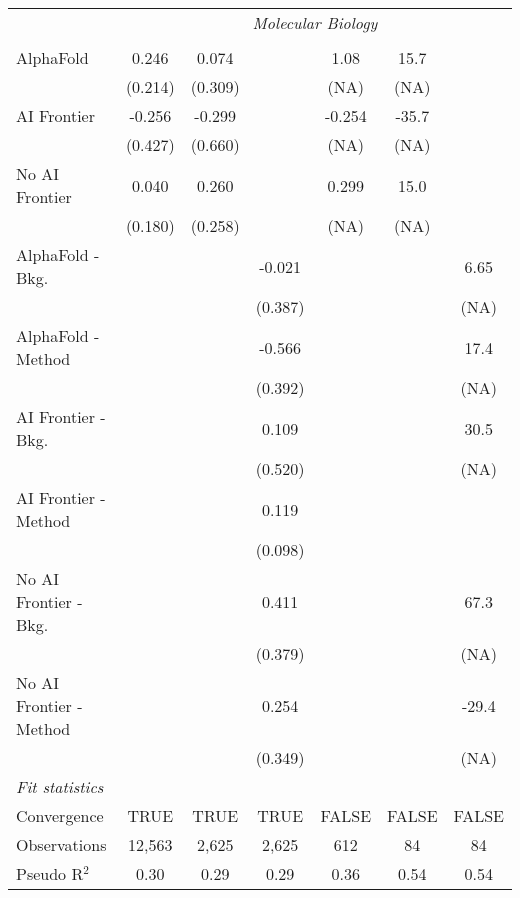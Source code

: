 \begin{tabular}{lcccccc}
 & \multicolumn{6}{c}{\textit{Molecular Biology}} \\ \\
   AlphaFold               & 0.246   & 0.074   &         & 1.08   & 15.7  &   \\   
                           & (0.214) & (0.309) &         & (NA)   & (NA)  &   \\   
   AI Frontier             & -0.256  & -0.299  &         & -0.254 & -35.7 &   \\   
                           & (0.427) & (0.660) &         & (NA)   & (NA)  &   \\   
   No AI Frontier          & 0.040   & 0.260   &         & 0.299  & 15.0  &   \\   
                           & (0.180) & (0.258) &         & (NA)   & (NA)  &   \\   
   AlphaFold - Bkg.        &         &         & -0.021  &        &       & 6.65\\   
                           &         &         & (0.387) &        &       & (NA)\\   
   AlphaFold - Method      &         &         & -0.566  &        &       & 17.4\\   
                           &         &         & (0.392) &        &       & (NA)\\   
   AI Frontier - Bkg.      &         &         & 0.109   &        &       & 30.5\\   
                           &         &         & (0.520) &        &       & (NA)\\   
   AI Frontier - Method    &         &         & 0.119   &        &       &   \\   
                           &         &         & (0.098) &        &       &   \\   
   No AI Frontier - Bkg.   &         &         & 0.411   &        &       & 67.3\\   
                           &         &         & (0.379) &        &       & (NA)\\   
   No AI Frontier - Method &         &         & 0.254   &        &       & -29.4\\   
                           &         &         & (0.349) &        &       & (NA)\\   
   \midrule
   \emph{Fit statistics}\\
   Convergence             &TRUE     & TRUE    & TRUE    & FALSE  & FALSE & FALSE\\  
   Observations            & 12,563  & 2,625   & 2,625   & 612    & 84    & 84\\  
   Pseudo R$^2$            & 0.30    & 0.29    & 0.29    & 0.36   & 0.54  & 0.54\\  
   

\end{tabular}
